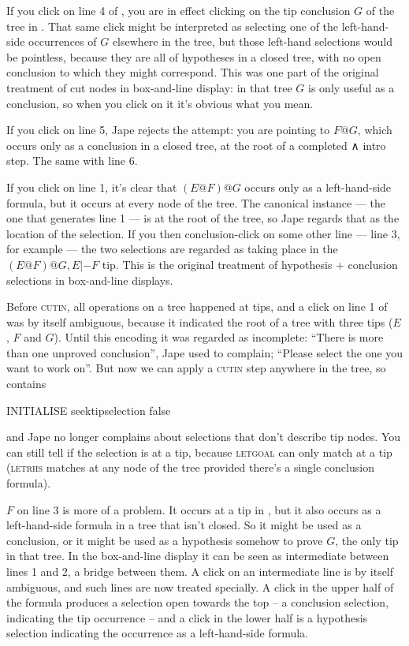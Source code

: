 If you click on line 4 of , you are in effect clicking on the tip conclusion $G$ of the tree in . That same click might be interpreted as selecting one of the left-hand-side occurrences of $G$ elsewhere in the tree, but those left-hand selections would be pointless, because they are all of hypotheses in a closed tree, with no open conclusion to which they might correspond. This was one part of the original treatment of cut nodes in box-and-line display: in that tree $G$ is only useful as a conclusion, so when you click on it it's obvious what you mean.

If you click on line 5, Jape rejects the attempt: you are pointing to $F@G$, which occurs only as a conclusion in a closed tree, at the root of a completed ∧ intro step. The same with line 6.

If you click on line 1, it's clear that $(E@F)@G$ occurs only as a left-hand-side formula, but it occurs at every node of the tree. The canonical instance --- the one that generates line 1 --- is at the root of the tree, so Jape regards that as the location of the selection. If you then conclusion-click on some other line --- line 3, for example --- the two selections are regarded as taking place in the $(E@F)@G, E |- F$ tip. This is the original treatment of hypothesis + conclusion selections in box-and-line displays.

Before \textsc{cutin}, all operations on a tree happened at tips, and a click on line 1 of  was by itself ambiguous, because it indicated the root of a tree with three tips ($E$, $F$ and $G$). Until this encoding it was regarded as incomplete: ``There is more than one unproved conclusion'', Jape used to complain; ``Please select the one you want to work on''. But now we can apply a \textsc{cutin} step anywhere in the tree, so  contains
\begin{japeish}
INITIALISE seektipselection false
\end{japeish}
and Jape no longer complains about selections that don't describe tip nodes. You can still tell if the selection is at a tip, because \textsc{letgoal} can only match at a tip (\textsc{letrhs} matches at any node of the tree provided there's a single conclusion formula).

$F$ on line 3 is more of a problem. It occurs at a tip in , but it also occurs as a left-hand-side formula in a tree that isn't closed. So it might be used as a conclusion, or it might be used as a hypothesis somehow to prove $G$, the only tip in that tree. In the box-and-line display it can be seen as intermediate between lines 1 and 2, a bridge between them. A click on an intermediate line is by itself ambiguous, and such lines are now treated specially. A click in the upper half of the formula produces a selection open towards the top -- a conclusion selection, indicating the tip occurrence -- and a click in the lower half is a hypothesis selection indicating the occurrence as a left-hand-side formula.

